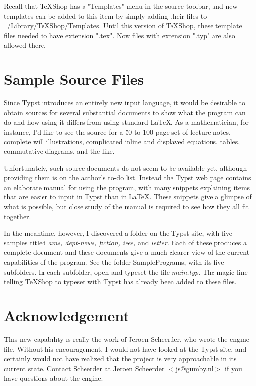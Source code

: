 \documentclass[11pt, oneside]{article}   	%
\begin{document}
Recall that TeXShop has a "Templates" menu in the source toolbar, and new templates can be added to this
item by simply adding their files to ~/Library/TeXShop/Templates. Until this version of TeXShop, these template
files needed to have extension ".tex". Now files with extension ".typ" are also allowed there.

\newpage
\section{Sample Source Files}

Since Typst introduces an entirely new input language, it would be desirable to obtain sources for several substantial documents to show what the program can do and how using it differs from using standard LaTeX.  As a mathematician, 
for instance, I'd like to see the source for a 50 to 100 page set of lecture notes, complete will illustrations, complicated inline and displayed equations, tables, commutative diagrams, and the like.

Unfortunately, such source documents do not seem to be available yet, although providing them is on the author's to-do list. Instead the Typst web page contains an elaborate manual for using the program, with many snippets explaining items that are easier to input in Typst than in LaTeX.  These snippets give a glimpse of what is possible, but close study
of the manual is required to see how they all fit together.

In the meantime, however, I discovered a folder on the Typst site, with five samples titled
{\em ams, dept-news, fiction, ieee,} and {\em letter}. Each of these produces a complete document  and these documents give a much clearer view of the current capabilities of the program.  See the folder SamplePrograms, with its five subfolders. In each subfolder, open and typeset the file {\em main.typ}. 
The magic line telling TeXShop to typeset with Typst has already
been added to these files. 

\section{Acknowledgement}

This new capability is really the work of Jeroen Scheerder, who wrote the engine file. Without his encouragement, I would not have  looked at the Typst site,  and certainly would not have realized that the project is very approachable in its current state. Contact Scheerder at \href{mailto:js@gumby.nl}{Jeroen Scheerder $<$js@gumby.nl$>$} if you have questions about the engine.
\end{document}
